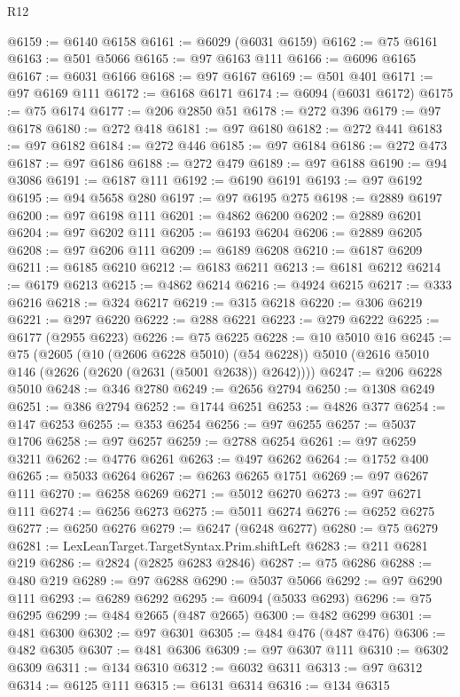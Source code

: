 \begin{lexlean}{R12}
\begin{coremodule}
@6159 := @6140 @6158
@6161 := @6029 (@6031 @6159)
@6162 := @75 @6161
@6163 := @501 @5066
@6165 := @97 @6163 @111
@6166 := @6096 @6165
@6167 := @6031 @6166
@6168 := @97 @6167
@6169 := @501 @401
@6171 := @97 @6169 @111
@6172 := @6168 @6171
@6174 := @6094 (@6031 @6172)
@6175 := @75 @6174
@6177 := @206 @2850 @51
@6178 := @272 @396
@6179 := @97 @6178
@6180 := @272 @418
@6181 := @97 @6180
@6182 := @272 @441
@6183 := @97 @6182
@6184 := @272 @446
@6185 := @97 @6184
@6186 := @272 @473
@6187 := @97 @6186
@6188 := @272 @479
@6189 := @97 @6188
@6190 := @94 @3086
@6191 := @6187 @111
@6192 := @6190 @6191
@6193 := @97 @6192
@6195 := @94 @5658 @280
@6197 := @97 @6195 @275
@6198 := @2889 @6197
@6200 := @97 @6198 @111
@6201 := @4862 @6200
@6202 := @2889 @6201
@6204 := @97 @6202 @111
@6205 := @6193 @6204
@6206 := @2889 @6205
@6208 := @97 @6206 @111
@6209 := @6189 @6208
@6210 := @6187 @6209
@6211 := @6185 @6210
@6212 := @6183 @6211
@6213 := @6181 @6212
@6214 := @6179 @6213
@6215 := @4862 @6214
@6216 := @4924 @6215
@6217 := @333 @6216
@6218 := @324 @6217
@6219 := @315 @6218
@6220 := @306 @6219
@6221 := @297 @6220
@6222 := @288 @6221
@6223 := @279 @6222
@6225 := @6177 (@2955 @6223)
@6226 := @75 @6225
@6228 := @10 @5010 @16
@6245 := @75
    (@2605
      (@10 (@2606 @6228 @5010) (@54 @6228))
      @5010
      (@2616 @5010 @146 (@2626 (@2620 (@2631 (@5001 @2638)) @2642))))
@6247 := @206 @6228 @5010
@6248 := @346 @2780
@6249 := @2656 @2794
@6250 := @1308 @6249
@6251 := @386 @2794
@6252 := @1744 @6251
@6253 := @4826 @377
@6254 := @147 @6253
@6255 := @353 @6254
@6256 := @97 @6255
@6257 := @5037 @1706
@6258 := @97 @6257
@6259 := @2788 @6254
@6261 := @97 @6259 @3211
@6262 := @4776 @6261
@6263 := @497 @6262
@6264 := @1752 @400
@6265 := @5033 @6264
@6267 := @6263 @6265 @1751
@6269 := @97 @6267 @111
@6270 := @6258 @6269
@6271 := @5012 @6270
@6273 := @97 @6271 @111
@6274 := @6256 @6273
@6275 := @5011 @6274
@6276 := @6252 @6275
@6277 := @6250 @6276
@6279 := @6247 (@6248 @6277)
@6280 := @75 @6279
@6281 := LexLeanTarget.TargetSyntax.Prim.shiftLeft
@6283 := @211 @6281 @219
@6286 := @2824 (@2825 @6283 @2846)
@6287 := @75 @6286
@6288 := @480 @219
@6289 := @97 @6288
@6290 := @5037 @5066
@6292 := @97 @6290 @111
@6293 := @6289 @6292
@6295 := @6094 (@5033 @6293)
@6296 := @75 @6295
@6299 := @484 @2665 (@487 @2665)
@6300 := @482 @6299
@6301 := @481 @6300
@6302 := @97 @6301
@6305 := @484 @476 (@487 @476)
@6306 := @482 @6305
@6307 := @481 @6306
@6309 := @97 @6307 @111
@6310 := @6302 @6309
@6311 := @134 @6310
@6312 := @6032 @6311
@6313 := @97 @6312
@6314 := @6125 @111
@6315 := @6131 @6314
@6316 := @134 @6315

\end{coremodule}
\end{lexlean}
